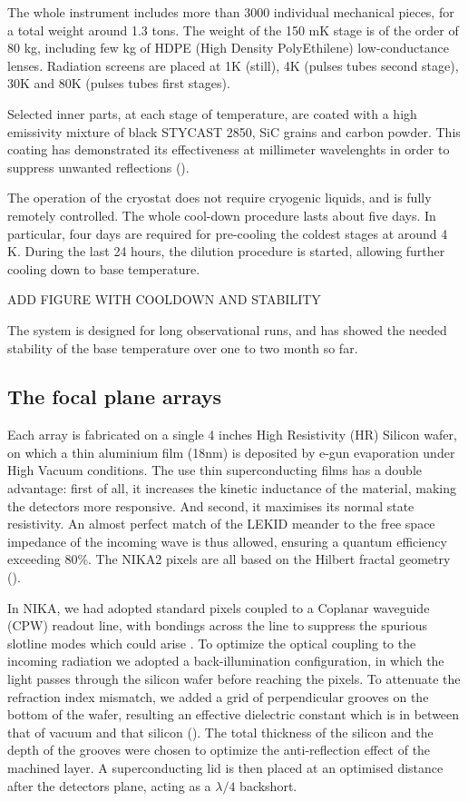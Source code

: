 \documentclass[]{aa} %
\begin{document}
The whole instrument includes more than 3000 individual mechanical pieces, for a total weight around 1.3 tons. The weight of the 150 mK stage is of the order of 80 kg, including few kg of HDPE (High Density PolyEthilene) low-conductance lenses. Radiation screens are placed at 1K (still), 4K (pulses tubes second stage), 30K and 80K (pulses tubes first stages).

Selected inner parts, at each stage of temperature, are coated with a high emissivity mixture of black STYCAST 2850, SiC grains and carbon powder. This coating has demonstrated its effectiveness at millimeter wavelenghts in order to suppress unwanted reflections (\cite{Calvo2010}).

The operation of the cryostat does not require cryogenic liquids, and is fully remotely controlled. The whole cool-down procedure lasts about five days. In particular, four days are required for pre-cooling the coldest stages at around 4 K. During the last 24 hours, the dilution procedure is started, allowing further cooling down to base temperature. 

ADD FIGURE WITH COOLDOWN AND STABILITY

The system is designed for long observational runs, and has showed the needed stability of the base temperature over one to two month so far. 

 \subsection{The focal plane arrays}

Each array is fabricated on a single 4 inches High Resistivity (HR) Silicon wafer, on which a thin aluminium film (18nm) is deposited by e-gun evaporation under High Vacuum conditions. The use thin superconducting films has a double advantage: first of all, it increases the kinetic inductance of the material, making the detectors more responsive. And second, it maximises its normal state resistivity. An almost perfect match of the LEKID meander to the free space impedance of the incoming wave is thus allowed, ensuring a quantum efficiency exceeding 80\%. The NIKA2 pixels are all based on the Hilbert fractal geometry (\cite{Roesch2012}). 

In NIKA, we had adopted standard pixels coupled to a Coplanar waveguide (CPW) readout line, with bondings across the line to suppress the spurious slotline modes which could arise . To optimize the optical coupling to the incoming radiation we adopted a back-illumination configuration, in which the light passes through the silicon wafer before reaching the pixels. To attenuate the refraction index mismatch, we added a grid of perpendicular grooves on the bottom of the wafer, resulting an effective dielectric constant which is in between that of vacuum and that silicon (\cite{Goupy2016}). The total thickness of the silicon and the depth of the grooves were chosen to optimize the anti-reflection effect of the machined layer. A superconducting lid is then placed at an optimised distance after the detectors plane, acting as a $\lambda/4$ backshort. 
\end{document}
